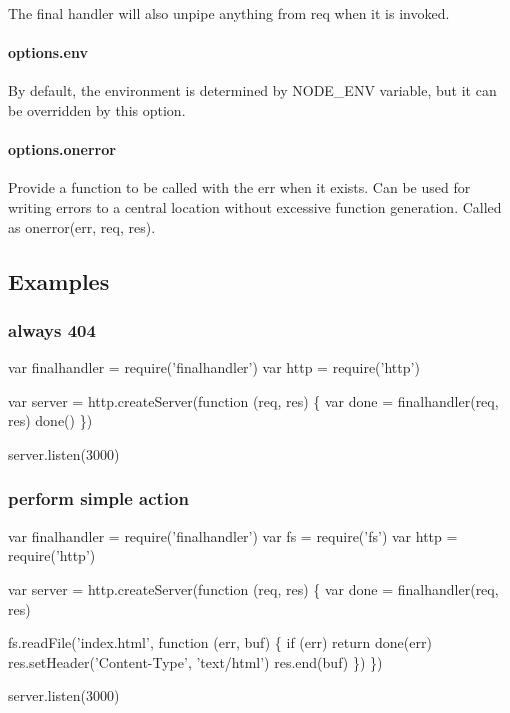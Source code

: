 The final handler will also unpipe anything from {\ttfamily req} when it is invoked.

\paragraph*{options.\+env}

By default, the environment is determined by {\ttfamily N\+O\+D\+E\+\_\+\+E\+NV} variable, but it can be overridden by this option.

\paragraph*{options.\+onerror}

Provide a function to be called with the {\ttfamily err} when it exists. Can be used for writing errors to a central location without excessive function generation. Called as {\ttfamily onerror(err, req, res)}.

\subsection*{Examples}

\subsubsection*{always 404}


\begin{DoxyCode}
var finalhandler = require('finalhandler')
var http = require('http')

var server = http.createServer(function (req, res) \{
  var done = finalhandler(req, res)
  done()
\})

server.listen(3000)
\end{DoxyCode}


\subsubsection*{perform simple action}


\begin{DoxyCode}
var finalhandler = require('finalhandler')
var fs = require('fs')
var http = require('http')

var server = http.createServer(function (req, res) \{
  var done = finalhandler(req, res)

  fs.readFile('index.html', function (err, buf) \{
    if (err) return done(err)
    res.setHeader('Content-Type', 'text/html')
    res.end(buf)
  \})
\})

server.listen(3000)
\end{DoxyCode}


